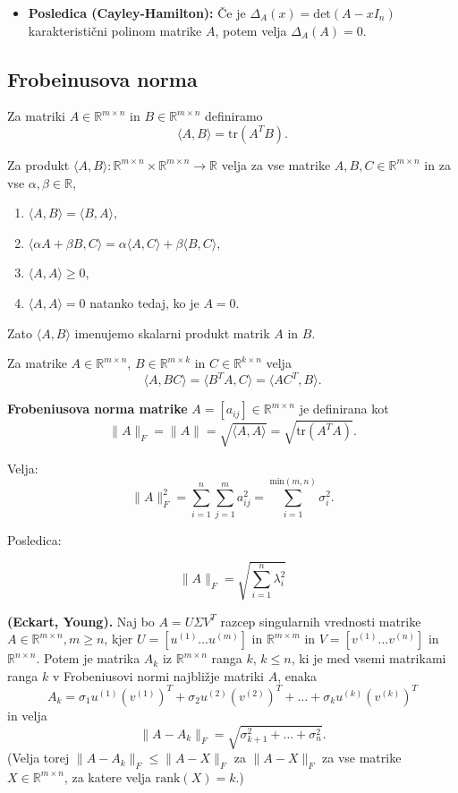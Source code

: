 \documentclass{article}
\begin{document}
\begin{multicols}{2}
\begin{itemize}
		\item \textbf{Posledica (Cayley-Hamilton):} Če je \( \Delta_A(x) = \text{det}(A - xI_n) \) karakteristični polinom matrike \( A \), potem velja \( \Delta_A(A) = 0 \).
	\end{itemize}

	\subsection{Frobeinusova norma}

	Za matriki \( A \in \mathbb{R}^{m \times n} \) in \( B \in \mathbb{R}^{m \times n} \) definiramo
	\[
		\langle A, B \rangle = \text{tr}(A^T B).
	\]

	Za produkt \( \langle A, B \rangle: \mathbb{R}^{m \times n} \times \mathbb{R}^{m \times n} \rightarrow \mathbb{R} \) velja za vse matrike \( A, B, C \in \mathbb{R}^{m \times n} \) in za vse \( \alpha, \beta \in \mathbb{R} \),
	\begin{enumerate}
		\item \( \langle A, B \rangle = \langle B, A \rangle \),
		\item \( \langle \alpha A + \beta B, C \rangle = \alpha \langle A, C \rangle + \beta \langle B, C \rangle \),
		\item \( \langle A, A \rangle \geq 0 \),
		\item \( \langle A, A \rangle = 0 \) natanko tedaj, ko je \( A = 0 \).
	\end{enumerate}
	Zato \( \langle A, B \rangle \) imenujemo skalarni produkt matrik \( A \) in \( B \).

	Za matrike \( A \in \mathbb{R}^{m \times n} \), \( B \in \mathbb{R}^{m \times k} \) in \( C \in \mathbb{R}^{k \times n} \) velja
	\[
		\langle A, BC \rangle = \langle B^T A, C \rangle = \langle A C^T, B \rangle.
	\]


	\textbf{Frobeniusova norma matrike} \( A = [a_{ij}] \in \mathbb{R}^{m \times n} \) je definirana kot
	\[
		\|A\|_F = \|A\| = \sqrt{\langle A, A \rangle} = \sqrt{\text{tr}(A^T A)}.
	\]

	Velja:
	\[
		\|A\|_F^2 = \sum_{i=1}^{n} \sum_{j=1}^{m} a_{ij}^2 = \sum_{i=1}^{\text{min}(m,n)} \sigma_i^2.
	\]

	Posledica:

	\[
		\|A\|_F = \sqrt{\sum_{i=1}^{n} \lambda_i^2}
	\]

	\textbf{(Eckart, Young).} Naj bo \( A = U\Sigma V^T \) razcep singularnih vrednosti matrike \( A \in \mathbb{R}^{m \times n}, m \geq n \), kjer \( U = [u^{(1)} \ldots u^{(m)}] \) in \( \mathbb{R}^{m \times m} \) in \( V = [v^{(1)} \ldots v^{(n)}] \) in \( \mathbb{R}^{n \times n} \). Potem je matrika \( A_k \) iz \( \mathbb{R}^{m \times n} \) ranga \( k \), \( k \leq n \), ki je med vsemi matrikami ranga \( k \) v Frobeniusovi normi najbližje matriki \( A \), enaka
	\[
		A_k = \sigma_1 u^{(1)}(v^{(1)})^T + \sigma_2 u^{(2)}(v^{(2)})^T + \ldots + \sigma_k u^{(k)}(v^{(k)})^T
	\]
	in velja
	\[
		\| A - A_k \|_F = \sqrt{\sigma_{k+1}^2 + \ldots + \sigma_n^2}.
	\]
	(Velja torej \( \|A - A_k\|_F \leq \|A - X\|_F \) za \( \|A - X\|_F \) za vse matrike \( X \in \mathbb{R}^{m \times n} \), za katere velja \( \text{rank}(X) = k \).)


\end{multicols}
\end{document}
